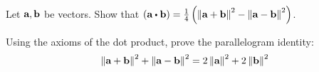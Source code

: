 \begin{enumialphparenastyle}
\begin{ex} Let $\mbox{\bf a},\mbox{\bf b}$ be vectors. Show that $\tup{\vect{a}\dotprod \vect{b}} =\frac{1}{4}\tup{\norm{
\vect{a}+\vect{b}} ^{2}-\norm{\vect{a}-\vect{b}} ^{2}} $.
\end{ex}

\begin{ex} Using the axioms of the dot product, prove the parallelogram identity: 
\begin{equation*}
\left\|\mbox{\bf a}+\mbox{\bf b}\right\| ^{2}+\left\|\mbox{\bf a}-\mbox{\bf b}\right\|
^{2}=2\left\|\mbox{\bf a}\right\| ^{2}+2\left\|\mbox{\bf b}
\right\| ^{2}
\end{equation*}
\end{ex}

\end{enumialphparenastyle}
